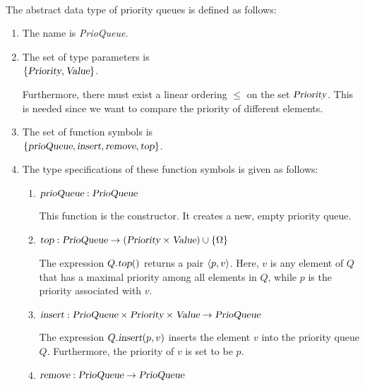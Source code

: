 \begin{Definition} \hspace*{\fill} \\
  The abstract data type of priority queues is defined as follows:
  \begin{enumerate}
  \item The name is \textsl{PrioQueue}.
  \item The set of type parameters is \\[0.1cm]
        \hspace*{1.3cm} $\{ \textsl{Priority}, \textsl{Value} \}$.

        Furthermore, there must exist a linear ordering $\leq$ on the set $\textsl{Priority}$.
        This is needed since we want to compare the priority of different elements.
  \item The set of function symbols is \\[0.1cm]
       \hspace*{1.3cm} 
       $\{ \textsl{prioQueue}, \textsl{insert}, \textsl{remove}, \textsl{top} \}$.
  \item The type specifications of these function symbols is given as follows:
        \begin{enumerate}
        \item $\textsl{prioQueue}: \textsl{PrioQueue}$

              This function is the constructor. It creates a new, empty priority queue.
        \item $\textsl{top}: \textsl{PrioQueue}  \rightarrow (\textsl{Priority} \times \textsl{Value}) \cup \{\Omega\}$

              The expression $Q.\textsl{top}()$ returns a pair $\pair(p,v)$.  Here,  $v$ is any
              element of $Q$ that has a  maximal priority among all elements in $Q$, while $p$ is
              the priority associated with $v$. 
        \item $\textsl{insert}: \textsl{PrioQueue} \times \textsl{Priority} \times \textsl{Value} \rightarrow \textsl{PrioQueue}$

              The expression $Q.\textsl{insert}(p,v)$ inserts the  element $v$ into the priority queue $Q$.
              Furthermore, the priority of $v$ is set to be $p$.
        \item $\textsl{remove}: \textsl{PrioQueue} \rightarrow \textsl{PrioQueue}$


\end{enumerate}
\end{enumerate}
\end{Definition}
